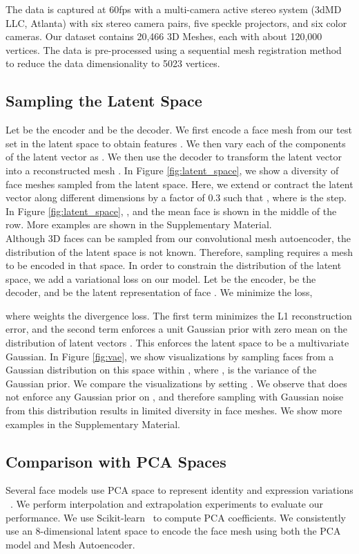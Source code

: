 The data is captured at 60fps with a multi-camera active stereo system
(3dMD LLC, Atlanta) with six stereo camera pairs, five speckle projectors, and
six color cameras.  Our dataset contains 20,466 3D Meshes, each with about 120,000 vertices. The data is pre-processed using a sequential mesh registration method~\cite{FLAME2017} to reduce the data dimensionality to 5023 vertices.

\subsection{Sampling the Latent Space}
\label{sec:latent_sampling}
Let  be the encoder and  be the decoder.
We first encode a face mesh from our test set in the latent space to obtain features . We then vary each of the components of the latent vector as . We then use the decoder to transform the latent vector into a reconstructed mesh . In Figure \ref{fig:latent_space}, we show a diversity of face meshes sampled from the latent space. Here, we extend or contract the latent vector along different dimensions by a factor of 0.3 such that , where  is the step. In Figure \ref{fig:latent_space}, , and the mean face  is shown in the middle of the row. More examples are shown in the Supplementary Material. \\

Although 3D faces can be sampled from our convolutional mesh autoencoder, the distribution of the latent space is not known. Therefore, sampling requires a mesh to be encoded in that space. In order to constrain the distribution of the latent space, we add a variational loss on our model. Let  be the encoder,  be the decoder, and  be the latent representation of face . We minimize the loss,

where  weights the  divergence loss. The first term minimizes the L1 reconstruction error, and the second term enforces a unit Gaussian prior  with zero mean on the distribution of latent vectors . This enforces the latent space to be a multivariate Gaussian. In Figure \ref{fig:vae}, we show visualizations by sampling faces from a Gaussian distribution on this space within , where , is the variance of the Gaussian prior. We compare the visualizations by setting . We observe that  does not enforce any Gaussian prior on , and therefore sampling with Gaussian noise from this distribution results in limited diversity in face meshes. We show more examples in the Supplementary Material.


\subsection{Comparison with PCA Spaces}
\label{sec:comparison_pca}
Several face models use PCA space to represent identity and expression variations ~\cite{Tewari2017,FLAME2017,Amberg2008,Breidt2011,Yang2011}. We perform interpolation and extrapolation experiments to evaluate our performance. We use Scikit-learn~\cite{scikit-learn} to compute PCA coefficients. We consistently use an 8-dimensional latent space to encode the face mesh using both the PCA model and Mesh Autoencoder.

